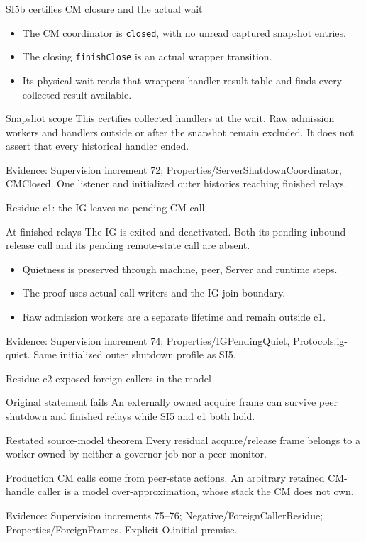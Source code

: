 \documentclass[11pt,aspectratio=169]{beamer}
\newcommand{\evidence}[1]{\vfill{\fontsize{7}{8}\selectfont\color{Muted}Evidence: #1\par}}
\begin{document}
\begin{frame}{SI5b certifies CM closure and the actual wait}
\begin{itemize}\setlength\itemsep{2.5mm}
\item The CM coordinator is \texttt{closed}, with no unread captured snapshot entries.
\item The closing \texttt{finishClose} is an actual wrapper transition.
\item Its physical wait reads that wrapper\textquotesingle s handler-result table and finds every collected result available.
\end{itemize}\begin{alertblock}{Snapshot scope}
This certifies collected handlers at the wait. Raw admission workers and handlers outside or after the snapshot remain excluded. It does not assert that every historical handler ended.
\end{alertblock}
\evidence{Supervision increment 72; Properties/ServerShutdownCoordinator, CMClosed. One listener and initialized outer histories reaching finished relays.}
\end{frame}

\begin{frame}{Residue c1: the IG leaves no pending CM call}
\begin{block}{At finished relays}
The IG is exited and deactivated. Both its pending inbound-release call and its pending remote-state call are absent.
\end{block}\begin{itemize}\setlength\itemsep{2.5mm}
\item Quietness is preserved through machine, peer, Server and runtime steps.
\item The proof uses actual call writers and the IG join boundary.
\item Raw admission workers are a separate lifetime and remain outside c1.
\end{itemize}
\evidence{Supervision increment 74; Properties/IGPendingQuiet, Protocols.ig-quiet. Same initialized outer shutdown profile as SI5.}
\end{frame}

\begin{frame}{Residue c2 exposed foreign callers in the model}
\begin{block}{Original statement fails}
An externally owned acquire frame can survive peer shutdown and finished relays while SI5 and c1 both hold.
\end{block}\begin{block}{Restated source-model theorem}
Every residual acquire/release frame belongs to a worker owned by neither a governor job nor a peer monitor.
\end{block}\small Production CM calls come from peer-state actions. An arbitrary retained CM-handle caller is a model over-approximation, whose stack the CM does not own.
\evidence{Supervision increments 75--76; Negative/ForeignCallerResidue; Properties/ForeignFrames. Explicit O.initial premise.}
\end{frame}
\end{document}
